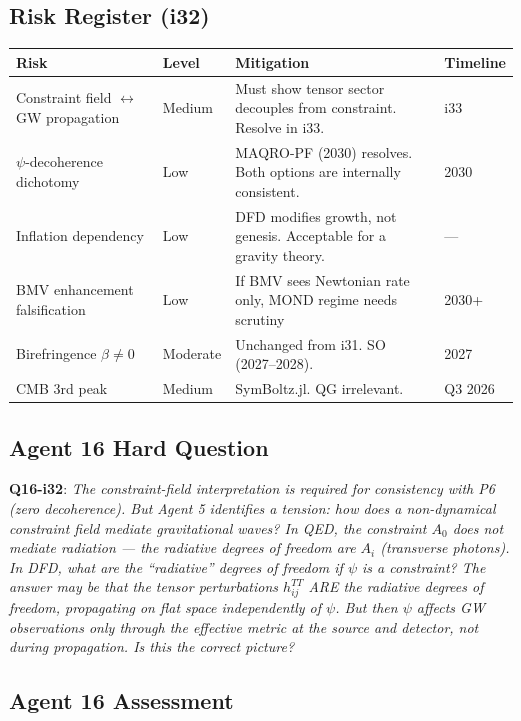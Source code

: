 \documentclass[11pt,a4paper]{article}
\begin{document}
\subsection{Risk Register (i32)}

\begin{center}
\begin{longtable}{p{3cm}lp{5cm}l}
\toprule
\textbf{Risk} & \textbf{Level} & \textbf{Mitigation} & \textbf{Timeline} \\
\midrule
\endfirsthead
Constraint field $\leftrightarrow$ GW propagation & Medium & Must show tensor sector decouples from constraint. Resolve in i33. & i33 \\
$\psi$-decoherence dichotomy & Low & MAQRO-PF (2030) resolves. Both options are internally consistent. & 2030 \\
Inflation dependency & Low & DFD modifies growth, not genesis. Acceptable for a gravity theory. & --- \\
BMV enhancement falsification & Low & If BMV sees Newtonian rate only, MOND regime needs scrutiny & 2030+ \\
Birefringence $\beta \neq 0$ & Moderate & Unchanged from i31. SO (2027--2028). & 2027 \\
CMB 3rd peak & Medium & SymBoltz.jl. QG irrelevant. & Q3 2026 \\
\bottomrule
\end{longtable}
\end{center}

\subsection{Agent 16 Hard Question}

\textbf{Q16-i32}: \emph{The constraint-field interpretation is required for consistency with P6 (zero decoherence). But Agent 5 identifies a tension: how does a non-dynamical constraint field mediate gravitational waves? In QED, the constraint $A_0$ does not mediate radiation --- the radiative degrees of freedom are $A_i$ (transverse photons). In DFD, what are the ``radiative'' degrees of freedom if $\psi$ is a constraint? The answer may be that the tensor perturbations $h_{ij}^{TT}$ ARE the radiative degrees of freedom, propagating on flat space independently of $\psi$. But then $\psi$ affects GW observations only through the effective metric at the source and detector, not during propagation. Is this the correct picture?}

\subsection{Agent 16 Assessment}
\end{document}
